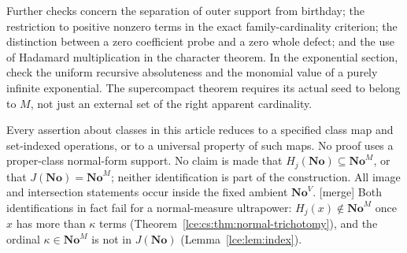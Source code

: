 \documentclass[11pt,letterpaper]{article}
\numberwithin{equation}{section}
\theoremstyle{definition}
\theoremstyle{remark}
\newcommand{\No}{\mathbf{No}}
\newcommand{\thref}[1]{Theorem~\ref{#1}}
\newcommand{\leref}[1]{Lemma~\ref{#1}}
\newcommand{\mergetag}{\textup{\textsf{\small[merge]}}}%
\begin{document}
Further checks concern the separation of outer support from birthday;
the restriction to positive nonzero terms in the exact family-cardinality
criterion; the distinction between a zero coefficient probe and a zero
whole defect; and the use of Hadamard multiplication in the character
theorem. In the exponential section, check the uniform recursive
absoluteness and the monomial value of a purely infinite exponential.
The supercompact theorem requires its actual seed to belong to $M$, not
just an external set of the right apparent cardinality.

Every assertion about classes in this article reduces to a specified class
map and set-indexed operations, or to a universal property of such maps.
No proof uses a proper-class normal-form support. No claim is made that
$H_j(\No)\subseteq\No^M$, or that $J(\No)=\No^M$; neither identification
is part of the construction. All image and intersection statements occur
inside the fixed ambient $\No^V$. \mergetag{} Both identifications in fact
fail for a normal-measure ultrapower: $H_j(x)\notin\No^M$ once $x$ has more
than $\kappa$ terms (\thref{lce:cs:thm:normal-trichotomy}), and the ordinal
$\kappa\in\No^M$ is not in $J(\No)$ (\leref{lce:lem:index}).
\end{document}
